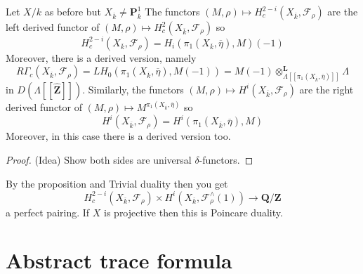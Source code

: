 \begin{proposition}
\label{proposition-curve-kpi1}
Let $X/k$ as before but $X_{\overline k}\neq \mathbf{P}^1_{\overline k}$
The functors
$
(M, \rho)\mapsto H_c^{2-i}(X_{\overline k}, \mathcal{F}_\rho)
$
are the left derived functor of
$(M, \rho)\mapsto H_c^2(X_{\overline k}, \mathcal{F}_\rho)$
so
$$
H_c^{2-i}(X_{\overline k}, \mathcal{F}_\rho) =
H_i(\pi_1(X_{\overline k}, \overline \eta), M)(-1)
$$
Moreover, there is a derived version, namely
$$
R\Gamma_c(X_{\overline k}, \mathcal{F}_\rho)
=
LH_0(\pi_1(X_{\overline k}, \overline \eta), M(-1))
=
M(-1)
\otimes_{\Lambda[[\pi_1(X_{\overline k}, \overline \eta)]]}^\mathbf{L}
\Lambda
$$
in $D(\Lambda[[\widehat{\mathbf{Z}}]])$.
Similarly, the functors
$(M, \rho)\mapsto H^i(X_{\overline k}, \mathcal{F}_\rho)$
are the right derived functor of
$(M, \rho)\mapsto M^{\pi_1(X_{\overline k}, \overline \eta)}$
so
$$
H^i(X_{\overline k}, \mathcal{F}_\rho) =
H^i(\pi_1(X_{\overline k}, \overline \eta), M)
$$
Moreover, in this case there is a derived version too.
\end{proposition}

\begin{proof}
(Idea) Show both sides are universal $\delta$-functors.
\end{proof}

\begin{remark}
\label{remark-poincare-groups}
By the proposition and Trivial duality then you get
$$
H^{2-i}_c(X_{\overline k}, \mathcal{F}_\rho)
\times
H^i(X_{\overline k}, \mathcal{F}_\rho^\wedge(1))
\to
\mathbf{Q}/\mathbf{Z}
$$
a perfect pairing. If $X$ is projective then this is Poincare duality.
\end{remark}





\section{Abstract trace formula}
\label{section-abstract-trace-formula}

